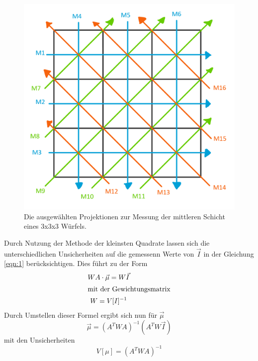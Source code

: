 \begin{figure}
  \centering
  \includegraphics[scale=0.5]{graphics/wuerfel.png}
  \caption{Die ausgewählten Projektionen zur Messung der mittleren Schicht eines 3x3x3 Würfels.}
  \label{fig:wuerfel}
\end{figure}

Durch Nutzung der Methode der kleinsten Quadrate lassen sich die unterschiedlichen Unsicherheiten auf die gemessenn Werte von $\vec{I}$ in der Gleichung \ref{eqn:1} berücksichtigen. Dies führt zu der Form
\begin{gather}
  WA\cdot\vec{\mu}=W\vec{I} \\
  \intertext{mit der Gewichtungsmatrix}
  W=V[I]^{-1}
  \label{eqn:gewicht}
\end{gather}
Durch Umstellen dieser Formel ergibt sich nun für $\vec{\mu}$
\begin{equation}
  \vec{\mu}=\left(A^TWA\right)^{-1}\left(A^TW\vec{I}\right)
\end{equation}
mit den Unsicherheiten
\begin{equation}
  V[\mu]=\left(A^TWA\right)^{-1}
  \label{eqn:mu}
\end{equation}
